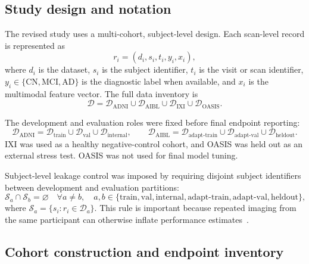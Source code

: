 \subsection{Study design and notation}
\label{sec:study_design}

The revised study uses a multi-cohort, subject-level design. Each scan-level record is represented as
\begin{equation}
r_i = \left(d_i, s_i, t_i, y_i, x_i\right),
\label{eq:record}
\end{equation}
where $d_i$ is the dataset, $s_i$ is the subject identifier, $t_i$ is the visit or scan identifier, $y_i \in \{\mathrm{CN},\mathrm{MCI},\mathrm{AD}\}$ is the diagnostic label when available, and $x_i$ is the multimodal feature vector. The full data inventory is
\begin{equation}
\mathcal{D} =
\mathcal{D}_{\mathrm{ADNI}} \cup
\mathcal{D}_{\mathrm{AIBL}} \cup
\mathcal{D}_{\mathrm{IXI}} \cup
\mathcal{D}_{\mathrm{OASIS}} .
\label{eq:data_union}
\end{equation}

The development and evaluation roles were fixed before final endpoint reporting:
\begin{equation}
\mathcal{D}_{\mathrm{ADNI}} =
\mathcal{D}_{\mathrm{train}} \cup
\mathcal{D}_{\mathrm{val}} \cup
\mathcal{D}_{\mathrm{internal}},
\qquad
\mathcal{D}_{\mathrm{AIBL}} =
\mathcal{D}_{\mathrm{adapt\mbox{-}train}} \cup
\mathcal{D}_{\mathrm{adapt\mbox{-}val}} \cup
\mathcal{D}_{\mathrm{heldout}} .
\label{eq:split_roles}
\end{equation}
IXI was used as a healthy negative-control cohort, and OASIS was held out as an external stress test. OASIS was not used for final model tuning.

Subject-level leakage control was imposed by requiring disjoint subject identifiers between development and evaluation partitions:
\begin{equation}
\mathcal{S}_a \cap \mathcal{S}_b = \varnothing
\quad
\forall a \neq b,\quad
a,b \in
\{\mathrm{train},\mathrm{val},\mathrm{internal},\mathrm{adapt\mbox{-}train},
\mathrm{adapt\mbox{-}val},\mathrm{heldout}\},
\label{eq:subject_disjoint}
\end{equation}
where $\mathcal{S}_a=\{s_i:r_i\in\mathcal{D}_a\}$. This rule is important because repeated imaging from the same participant can otherwise inflate performance estimates~\citep{varoquaux2017cross}.

\subsection{Cohort construction and endpoint inventory}
\label{sec:data}

